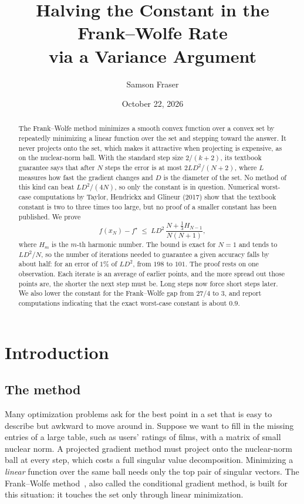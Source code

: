 \documentclass[11pt]{article}
\title{Halving the Constant in the Frank--Wolfe Rate\\ via a Variance Argument}
\author{Samson Fraser}
\date{October 22, 2026}
\theoremstyle{remark}
\begin{document}
\maketitle

\begin{abstract}
The Frank--Wolfe method minimizes a smooth convex function over a convex set by
repeatedly minimizing a linear function over the set and stepping toward the
answer. It never projects onto the set, which makes it attractive when projecting
is expensive, as on the nuclear-norm ball. With the standard step size
$2/(k+2)$, its textbook guarantee says that after $N$ steps the error is at most
$2LD^2/(N+2)$, where $L$ measures how fast the gradient changes and $D$ is the
diameter of the set. No method of this kind can beat $LD^2/(4N)$, so only the
constant is in question. Numerical worst-case computations by Taylor, Hendrickx
and Glineur (2017) show that the textbook constant is two to three times too large,
but no proof of a smaller constant has been published. We prove
\[
  f(x_N) - f^\star \;\le\; LD^2\,\frac{N + \frac13 H_{N-1}}{N(N+1)},
\]
where $H_m$ is the $m$-th harmonic number. The bound is exact for $N=1$ and tends
to $LD^2/N$, so the number of iterations needed to guarantee a given accuracy
falls by about half: for an error of $1\%$ of $LD^2$, from $198$ to $101$. The proof
rests on one observation. Each iterate is an average of earlier points, and the
more spread out those points are, the shorter the next step must be. Long steps
now force short steps later. We also lower the constant for the Frank--Wolfe gap
from $27/4$ to $3$, and report computations indicating that the exact worst-case
constant is about $0.9$.
\end{abstract}

\section{Introduction}

\subsection{The method}

Many optimization problems ask for the best point in a set that is easy to
describe but awkward to move around in. Suppose we want to fill in the missing
entries of a large table, such as users' ratings of films, with a matrix of small
nuclear norm. A projected gradient method must project onto the nuclear-norm ball
at every step, which costs a full singular value decomposition. Minimizing a
\emph{linear} function over the same ball needs only the top pair of singular
vectors. The Frank--Wolfe method~\cite{FW56}, also called the conditional
gradient method, is built for this situation: it touches the set only through
linear minimization.
\end{document}
